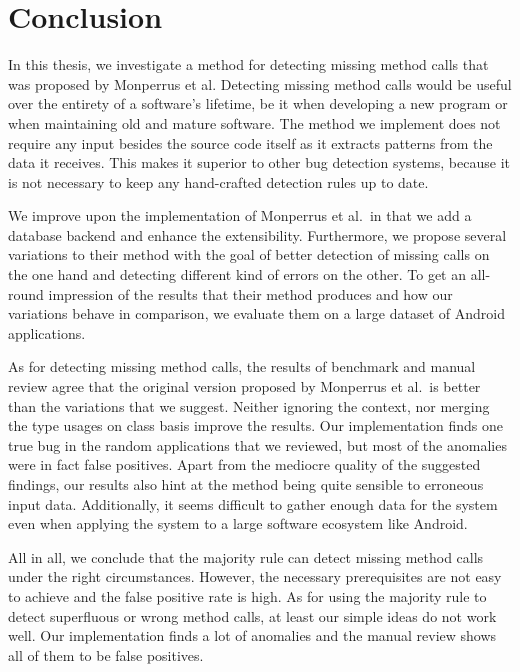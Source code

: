 \chapter{Conclusion}\label{ch:concl}

In this thesis, we investigate a method for detecting missing method calls that was proposed by Monperrus et al.
Detecting missing method calls would be useful over the entirety of a software's lifetime, be it when developing a new program or when maintaining old and mature software.
The method we implement does not require any input besides the source code itself as it extracts patterns from the data it receives.
This makes it superior to other bug detection systems, because it is not necessary to keep any hand-crafted detection rules up to date.

We improve upon the implementation of Monperrus et al.\ in that we add a database backend and enhance the extensibility.
Furthermore, we propose several variations to their method with the goal of better detection of missing calls on the one hand and detecting different kind of errors on the other.
To get an all-round impression of the results that their method produces and how our variations behave in comparison, we evaluate them on a large dataset of Android applications. 

As for detecting missing method calls, the results of benchmark and manual review agree that the original version proposed by Monperrus et al.\ is better than the variations that we suggest.
Neither ignoring the context, nor merging the type usages on class basis improve the results.
Our implementation finds one true bug in the random applications that we reviewed, but most of the anomalies were in fact false positives.
Apart from the mediocre quality of the suggested findings, our results also hint at the method being quite sensible to erroneous input data.
Additionally, it seems difficult to gather enough data for the system even when applying the system to a large software ecosystem like Android.

All in all, we conclude that the majority rule can detect missing method calls under the right circumstances.
However, the necessary prerequisites are not easy to achieve and the false positive rate is high.
As for using the majority rule to detect superfluous or wrong method calls, at least our simple ideas do not work well.
Our implementation finds a lot of anomalies and the manual review shows all of them to be false positives.


